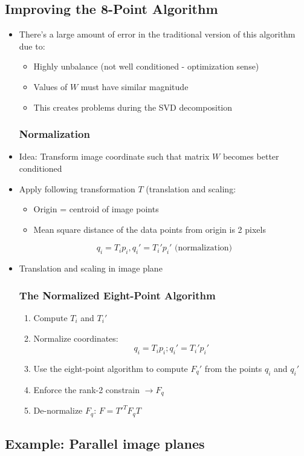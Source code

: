 \subsection{Improving the 8-Point Algorithm}
\begin{itemize}
	\item There's a large amount of error in the traditional version of this algorithm due to:
	\begin{itemize}
		\item Highly unbalance (not well conditioned - optimization sense)
		\item Values of $W$ must have similar magnitude
		\item This creates problems during the SVD decomposition
	\end{itemize}
	\subsubsection{Normalization}
	\item Idea: Transform image coordinate such that matrix $W$ becomes better conditioned
	\item Apply following transformation $T$ (translation and scaling:
	\begin{itemize}
	 	\item Origin = centroid of image points
	 	\item Mean square distance of the data points from origin is 2 pixels
	 \end{itemize} 
	 $$q_i = T_i p_i, q_i'=T_i' p_i'\text{ (normalization)}$$
	 \item Translation and scaling in image plane
	 \subsubsection{The Normalized Eight-Point Algorithm}
	 \begin{enumerate}
	 	\item Compute $T_i$ and $T_i'$
	 	\item Normalize coordinates:
	 		$$q_i = T_i p_i; q_i'=T_i' p_i'$$
 		\item Use the eight-point algorithm to compute $F_q'$ from the points $q_i$ and $q_i'$
 		\item Enforce the rank-2 constrain $\to F_q$
 		\item De-normalize $F_q$: $F=T'^TF_qT$
	 \end{enumerate}
\end{itemize}

\subsection{Example: Parallel image planes}
